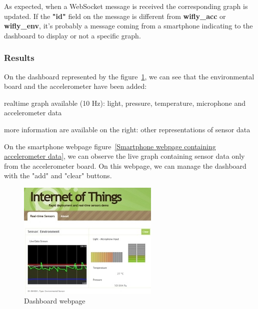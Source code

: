 \documentclass[pdftex,10pt,a4paper]{report}
\newenvironment{packed_item}{
\begin{itemize}
  \setlength{\itemsep}{1pt}
  \setlength{\parskip}{0pt}
  \setlength{\parsep}{0pt}
}{\end{itemize}}
\begin{document}
As expected, when a WebSocket message is received the corresponding graph is updated. If the \textbf{"id"} field on the message is different from \textbf{wifly\_acc} or \textbf{wifly\_env}, it's probably a message coming from a smartphone indicating to the dashboard to display or not a specific graph. 

\subsubsection{Results}

On the dashboard represented by the figure~\ref{Dashboard webpage}, we can see that the environmental board and the accelerometer have been added:
\begin{packed_item}
	\item realtime graph available (10 Hz): light, pressure, temperature, microphone and accelerometer data
	\item more information are available on the right: other representations of sensor data
\end{packed_item}

On the smartphone webpage figure~\ref{Smartphone webpage containing accelerometer data}, we can observe the live graph containing sensor data only from the accelerometer board. On this webpage, we can manage the dashboard with the "add" and "clear" buttons.
\newpage

\begin{figure}[h!]
		\centering
		\includegraphics[width=0.6\textwidth]{./dashboard.jpg}
		\caption{Dashboard webpage}
		\label{Dashboard webpage}
\end{figure}
\end{document}

